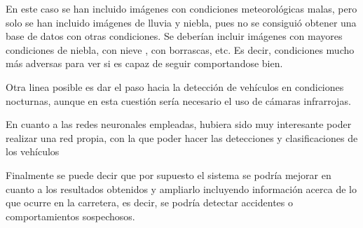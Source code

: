 En este caso se han incluido imágenes con condiciones meteorológicas malas, pero solo se han incluido imágenes de lluvia y niebla, pues no se consiguió obtener una base de datos con otras condiciones. Se deberían incluir imágenes con mayores condiciones de niebla, con nieve , con borrascas, etc. Es decir, condiciones mucho más adversas para ver si es capaz de seguir comportandose bien.

Otra linea posible es dar el paso hacia la detección de vehículos en condiciones nocturnas, aunque en esta cuestión sería necesario el uso de cámaras infrarrojas.

En cuanto a las redes neuronales empleadas, hubiera sido muy interesante poder realizar una red propia, con la que poder hacer las detecciones y clasificaciones de los vehículos

Finalmente se puede decir que por supuesto el sistema se podría mejorar en cuanto a los resultados obtenidos y ampliarlo incluyendo información acerca de lo que ocurre en la carretera, es decir, se podría detectar accidentes o comportamientos sospechosos.



